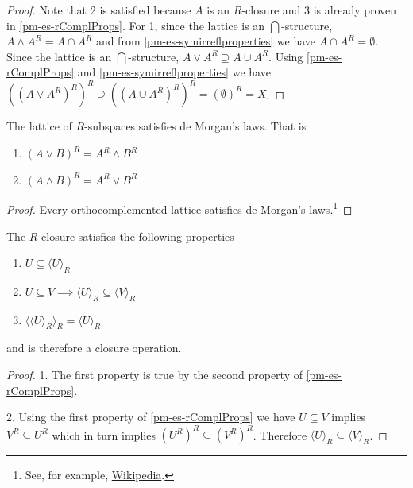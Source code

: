 \begin{mathSection}
	\begin{proof}
		Note that 2 is satisfied because $A$ is an $R$-closure and 3 is already proven in \ref{pm-es-rComplProps}.
		For 1, since the lattice is an $\bigcap$-structure, $A \wedge A^{R} = A \cap A^{R}$ and from \ref{pm-es-symirreflproperties} we have $A \cap A^{R} = \emptyset$. Since the lattice is an $\bigcap$-structure, $A \vee A^{R} \supseteq A \cup A^{R}$. Using \ref{pm-es-rComplProps} and \ref{pm-es-symirreflproperties} we have $((A \vee A^{R})^{R})^{R} \supseteq ((A \cup A^{R})^{R})^{R} = (\emptyset)^{R} = X$.
	\end{proof}
	
	\begin{coro}
		The lattice of $R$-subspaces satisfies de Morgan's laws. That is
		\begin{enumerate}
			\item $(A \vee B)^{R} = A^{R} \wedge B^{R}$
			\item $(A \wedge B)^{R} = A^{R} \vee B^{R}$
		\end{enumerate}
	\end{coro}
	
	\begin{proof}
		Every orthocomplemented lattice satisfies de Morgan's laws.\footnote{See, for example, \href{https://en.wikipedia.org/wiki/Complemented_lattice}{Wikipedia}.}
	\end{proof}
	
	\begin{coro}\label{pm-es-subspaceClosure}
		The $R$-closure satisfies the following properties
		\begin{enumerate}
			\item $U \subseteq \langle U \rangle_R$
			\item $U \subseteq V \implies \langle U \rangle_R \subseteq \langle V \rangle_R$
			\item $\langle \langle U \rangle_R \rangle_R = \langle U \rangle_R $
		\end{enumerate}
		and is therefore a closure operation.
	\end{coro}
	
	\begin{proof}
		1. The first property is true by the second property of \ref{pm-es-rComplProps}.
		
		2. Using the first property of \ref{pm-es-rComplProps} we have $U \subseteq V$ implies $V^{R} \subseteq U^{R}$ which in turn implies $(U^{R})^{R} \subseteq (V^{R})^{R}$. Therefore $\langle U \rangle_R \subseteq \langle V \rangle_R$.
		

\end{proof}
\end{mathSection}
